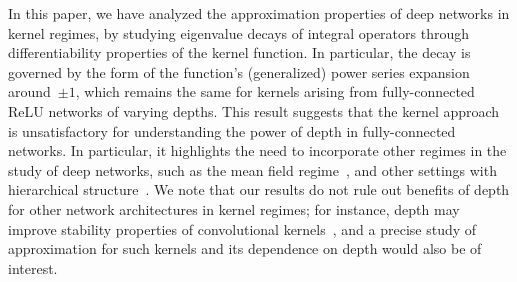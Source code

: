 
In this paper, we have analyzed the approximation properties of deep networks in kernel regimes, by studying eigenvalue decays of integral operators through differentiability properties of the kernel function.
In particular, the decay is governed by the form of the function's (generalized) power series expansion around~$\pm 1$, which remains the same for kernels arising from fully-connected ReLU networks of varying depths.
This result suggests that the kernel approach is unsatisfactory for understanding the power of depth in fully-connected networks.
In particular, it highlights the need to incorporate other regimes in the study of deep networks, such as the mean field regime~\citep{chizat2018global,mei2018mean}, and other settings with hierarchical structure~\citep[see, \eg,][]{allen2020backward,chen2020towards}.
We note that our results do not rule out benefits of depth for other network architectures in kernel regimes; for instance, depth may improve stability properties of convolutional kernels~\citep{bietti2019group,bietti2019inductive}, and a precise study of approximation for such kernels and its dependence on depth would also be of interest.